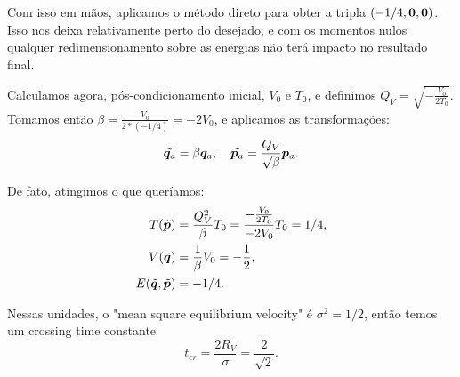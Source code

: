 Com isso em mãos, aplicamos o método direto para obter a tripla $(-1/4, \bm 0, \bm 0)$. Isso nos deixa relativamente perto do desejado, e com os momentos nulos qualquer redimensionamento sobre as energias não terá impacto no resultado final.

Calculamos agora, pós-condicionamento inicial, $V_0$ e $T_0$, e definimos $Q_V = \sqrt{-\frac{V_0}{2T_0}}$. Tomamos então $\beta = \frac{V_0}{2 * (-1/4)} = - 2 V_0$, e aplicamos as transformações:
\begin{equation}
    \tilde{\bm q_a} = \beta \bm q_a,
    \quad
    \tilde{\bm p_a} = \dfrac{Q_V}{\sqrt \beta} \bm p_a.
\end{equation}

De fato, atingimos o que queríamos:
\begin{align}
    T(\tilde{\bm p}) &= \dfrac{Q_V^2}{\beta} T_0 
    = \dfrac{-\frac{V_0}{2 T_0}}{- 2 V_0} T_0 = 1/4, \\
    V(\tilde{\bm q}) &= \dfrac{1}{\beta} V_0
    = -\dfrac{1}{2}, \\
    E(\tilde{\bm q}, \tilde{\bm p}) &= -1/4.
\end{align}

Nessas unidades, o "mean square equilibrium velocity" é $\sigma^2 = 1/2$, então temos um crossing time constante
\begin{equation}
    t_{cr} = \dfrac{2 R_V}{\sigma} = \dfrac{2}{\sqrt 2}.
\end{equation}